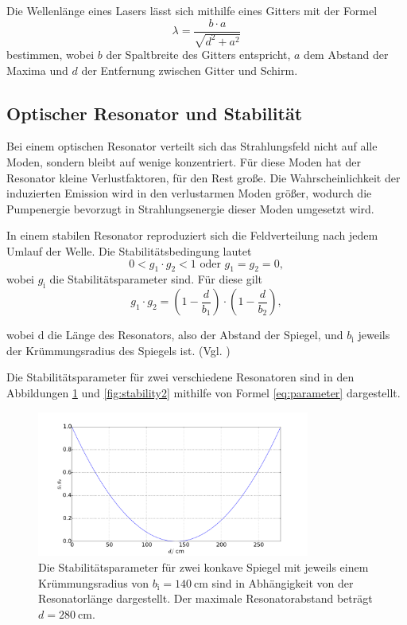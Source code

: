 Die Wellenlänge eines Lasers lässt sich mithilfe eines Gitters mit der Formel 
\begin{equation}
    \lambda = \frac{b \cdot a}{\sqrt{d^2 + a^2}}
    \label{eq:welle}
\end{equation}
bestimmen, wobei $b$ der Spaltbreite des Gitters entspricht, $a$ dem Abstand der Maxima und $d$ der Entfernung zwischen Gitter und Schirm.

\subsection{Optischer Resonator und Stabilität}
Bei einem optischen Resonator verteilt sich das Strahlungsfeld nicht auf alle Moden, sondern bleibt auf wenige konzentriert. Für diese Moden hat der Resonator kleine Verlustfaktoren, für den Rest große. Die Wahrscheinlichkeit der induzierten Emission wird in den verlustarmen Moden größer, wodurch die Pumpenergie bevorzugt in Strahlungsenergie dieser Moden umgesetzt wird.

In einem stabilen Resonator reproduziert sich die Feldverteilung nach jedem Umlauf der Welle.
Die Stabilitätsbedingung lautet
\begin{equation}
    0 < g_1 \cdot g_2 < 1 \text{ oder } g_1 = g_2 = 0,
    \label{eq:stabilitaet}
\end{equation}
wobei $g_\text{i}$ die Stabilitätsparameter sind.
Für diese gilt
\begin{equation}
    g_1 \cdot g_2 = \left(1-\frac{d}{b_1} \right)\cdot\left(1-\frac{d}{b_2} \right),
    \label{eq:parameter}
\end{equation}

wobei d die Länge des Resonators, also der Abstand der Spiegel, und $b_\text{i}$ jeweils der Krümmungsradius des Spiegels ist.
(Vgl. \cite{Laserspektroskopie})

Die Stabilitätsparameter für zwei verschiedene Resonatoren sind in den Abbildungen \ref{fig:stability1} und \ref{fig:stability2} mithilfe von Formel \ref{eq:parameter} dargestellt.

\begin{figure}
    \centering
    \includegraphics[width=0.8\textwidth]{plots/stability1.pdf}
    \caption{Die Stabilitätsparameter für zwei konkave Spiegel mit jeweils einem Krümmungsradius von $b_\text{i} = \SI{140}{\centi\meter}$ sind in Abhängigkeit von der Resonatorlänge dargestellt. Der maximale Resonatorabstand beträgt $d = \SI{280}{\centi\meter}$.}
    \label{fig:stability1}
\end{figure}

